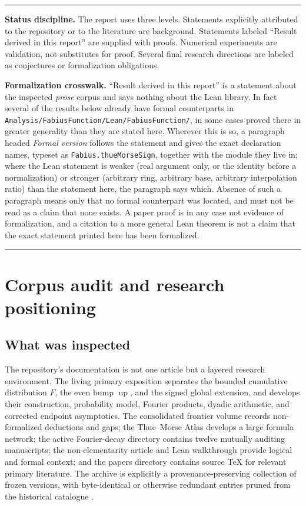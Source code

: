 \documentclass[11pt,oneside]{article}
\numberwithin{equation}{section}
\theoremstyle{definition}
\theoremstyle{remark}
\newcommand{\Up}{\operatorname{up}}
\newcommand{\lean}[1]{%
  \ifmmode\text{\texttt{\detokenize{#1}}}\else\nolinkurl{#1}\fi}
\newenvironment{boxedremark}{%
  \par\smallskip\noindent\begin{center}\begin{minipage}{0.94\textwidth}%
  \color{black}\hrule\vspace{0.6em}\small
}{%
  \vspace{0.6em}\hrule\end{minipage}\end{center}\smallskip
}
\begin{document}
\begin{boxedremark}
\textbf{Status discipline.}
The report uses three levels.  Statements explicitly attributed to the repository or to the
literature are background.  Statements labeled ``Result derived in this report'' are supplied
with proofs.  Numerical experiments are validation, not substitutes for proof.  Several final
research directions are labeled as conjectures or formalization obligations.

\smallskip
\textbf{Formalization crosswalk.}
``Result derived in this report'' is a statement about the inspected \emph{prose} corpus and
says nothing about the Lean library.  In fact several of the results below already have formal
counterparts in \nolinkurl{Analysis/FabiusFunction/Lean/FabiusFunction/}, in some cases proved
there in greater generality than they are stated here.  Wherever this is so, a paragraph
headed \emph{Formal version} follows the statement and gives the exact declaration names,
typeset as \lean{Fabius.thueMorseSign}, together with the module they live in; where the Lean
statement is weaker (real argument only, or the identity before a normalization) or stronger
(arbitrary ring, arbitrary base, arbitrary interpolation ratio) than the statement here, the
paragraph says which.  Absence of such a paragraph means only that no formal counterpart was
located, and must not be read as a claim that none exists.  A paper proof is in any case not
evidence of formalization, and a citation to a more general Lean theorem is not a claim that
the exact statement printed here has been formalized.
\end{boxedremark}

\tableofcontents
\clearpage

\section{Corpus audit and research positioning}
\label{sec:audit}

\subsection{What was inspected}

The repository's documentation is not one article but a layered research environment.  The
living primary exposition separates the bounded cumulative distribution $F$, the even bump
$\Up$, and the signed global extension, and develops their construction, probability model,
Fourier products, dyadic arithmetic, and corrected endpoint asymptotics.  The consolidated
frontier volume records non-formalized deductions and gaps; the Thue--Morse Atlas develops a
large formula network; the active Fourier-decay directory contains twelve mutually auditing
manuscripts; the non-elementarity article and Lean walkthrough provide logical and formal
context; and the papers directory contains source TeX for relevant primary literature.
The archive is explicitly a provenance-preserving collection of frozen versions, with
byte-identical or otherwise redundant entries pruned from the historical catalogue
\cite{proveit-primary,proveit-frontiers,proveit-atlas,proveit-fourier,proveit-archive}.
\end{document}
